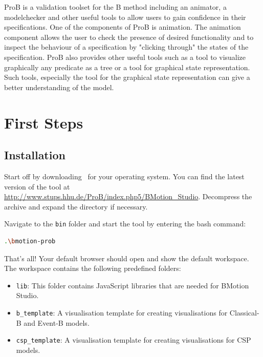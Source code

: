 \documentclass[twoside,10pt]{book}
\begin{document}
ProB is a validation toolset for the B method including an animator, a modelchecker and other useful tools to allow users to gain confidence in their specifications. One of the components of ProB is animation. The animation component allows the user to check the presence of desired functionality and to inspect the behaviour of a specification by "clicking through" the states of the specification. ProB also provides other useful tools such as a tool to visualize graphically any predicate as a tree or a tool for graphical state representation. Such tools, especially the tool for the graphical state representation can give a better understanding of the model.

\section{First Steps}
\label{first_steps}

\subsection{Installation}
\label{installation}

Start off by downloading \bms~for your operating system. 
You can find the latest version of the tool at \url{http://www.stups.hhu.de/ProB/index.php5/BMotion_Studio}.
Decompress the archive and expand the directory if necessary. 


Navigate to the \texttt{bin} folder and start the tool by entering the bash command:

\begin{lstlisting}[language=bash]
.\bmotion-prob
\end{lstlisting}


That's all! 
Your default browser should open and show the default workspace.
The workspace contains the following predefined folders:

\begin{itemize}
\item \texttt{lib}: This folder contains JavaScript libraries that are needed for BMotion Studio.
\item \texttt{b\_template}: A visualisation template for creating visualisations for Classical-B and Event-B models.
\item \texttt{csp\_template}: A visualisation template for creating visualisations for CSP models.
\end{itemize}
\end{document}
